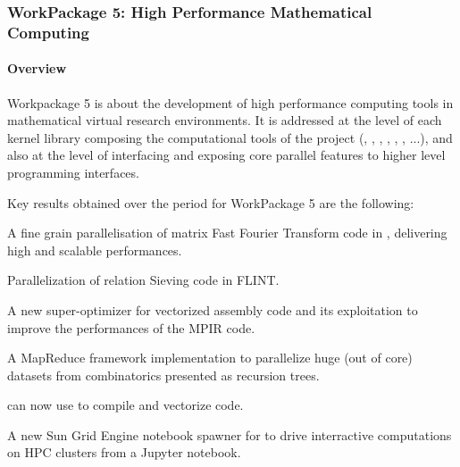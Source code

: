   \subsubsection{WorkPackage 5: High Performance Mathematical Computing}
  \label{hpc}


  \paragraph{Overview}

  Workpackage 5 is about the development of high performance computing tools in
  mathematical virtual research environments. It is addressed at the level
  of each kernel library composing the computational tools of the project (\Pari,
  \GAP, \Linbox, \MPIR, \Sage, \Singular, ...), and also at the level of interfacing and exposing
  core parallel features to higher level programming interfaces.

  Key results obtained over the period for WorkPackage 5 are the following:
  \begin{compactitem}
  \item A fine grain parallelisation of matrix Fast Fourier Transform code in
    \FLINT, delivering high and scalable performances.
  \item Parallelization of relation  Sieving code in FLINT.
  \item A new super-optimizer for vectorized assembly code and its
    exploitation to improve the performances of the MPIR code.
  \item A MapReduce framework implementation to parallelize huge (out of core) datasets from
    combinatorics presented as recursion trees.
  \item \Cython can now use \Pythran to compile and vectorize \Numpy code.
  \item A new Sun Grid Engine notebook spawner for \Jupyter to drive
    interractive computations on HPC clusters from a Jupyter notebook.
  \end{compactitem}

